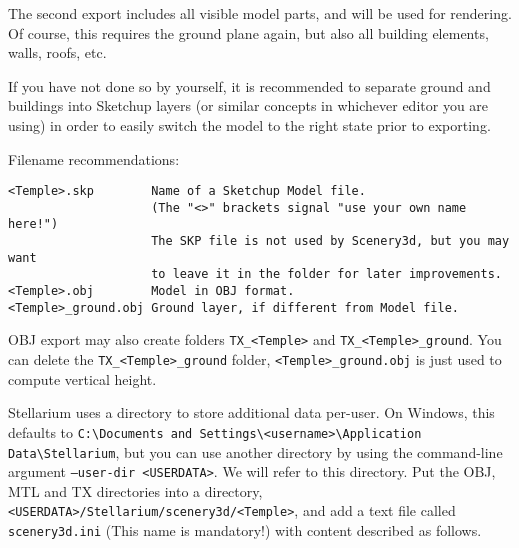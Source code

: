 \documentclass[a4paper]{article}
\newcommand{\cmd}[1]{\texttt{#1}}
\begin{document}
The second export includes all visible model parts, and will be used for
rendering. Of course, this requires the ground plane again, but also
all building elements, walls, roofs, etc. 

If you have not done so by yourself, it is recommended to separate
ground and buildings into Sketchup layers 
(or similar concepts in whichever editor you are using) 
in order to easily switch the model to the right state prior to exporting.

Filename recommendations: 
\begin{verbatim}
<Temple>.skp        Name of a Sketchup Model file. 
                    (The "<>" brackets signal "use your own name here!")
                    The SKP file is not used by Scenery3d, but you may want
                    to leave it in the folder for later improvements.
<Temple>.obj        Model in OBJ format. 
<Temple>_ground.obj Ground layer, if different from Model file. 
\end{verbatim}

OBJ export may also create folders \verb|TX_<Temple>| and
\verb|TX_<Temple>_ground|. You can delete the \verb|TX_<Temple>_ground| folder, 
\verb|<Temple>_ground.obj| is just used to compute vertical height.

Stellarium uses a directory to store additional data per-user. On Windows, this
defaults to \verb|C:\Documents and Settings\<username>\Application Data\Stellarium|, 
but you can use another directory by using the command-line
argument \cmd{--user-dir <USERDATA>}. We will refer to this directory. Put the
OBJ, MTL and TX directories into a directory, \\
\verb|<USERDATA>/Stellarium/scenery3d/<Temple>|, and add a text file
called \texttt{scenery3d.ini} (This name is mandatory!) with content described as
follows.

%
\end{document}
